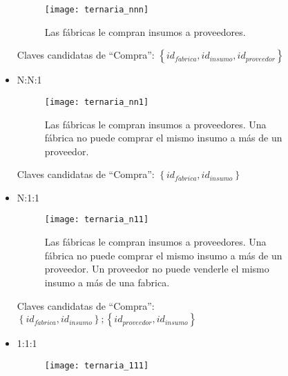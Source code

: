 \documentclass[a4paper, twoside]{article}
\begin{document}
\begin{description}
\begin{itemize}
\begin{figure}[H]
\noindent \begin{centering}
\texttt{[image: ternaria\_nnn]}
\par\end{centering}

\protect\caption{Las fábricas le compran insumos a proveedores.}


\end{figure}



Claves candidatas de ``Compra'': $\left\{ id_{f\acute{a}brica},id_{insumo},id_{proveedor}\right\} $

\item N:N:1


\begin{figure}[H]
\noindent \begin{centering}
\texttt{[image: ternaria\_nn1]}
\par\end{centering}

\protect\caption{Las fábricas le compran insumos a proveedores. Una fábrica no puede
comprar el mismo insumo a más de un proveedor.}
\end{figure}



Claves candidatas de ``Compra'': $\left\{ id_{f\acute{a}brica},id_{insumo}\right\} $

\item N:1:1


\begin{figure}[H]
\noindent \begin{centering}
\texttt{[image: ternaria\_n11]}
\par\end{centering}

\protect\caption{Las fábricas le compran insumos a proveedores. Una fábrica no puede
comprar el mismo insumo a más de un proveedor. Un proveedor no puede
venderle el mismo insumo a más de una fabrica.}
\end{figure}



Claves candidatas de ``Compra'': $\left\{ id_{f\acute{a}brica},id_{insumo}\right\} ;\left\{ id_{proveedor},id_{insumo}\right\} $

\item 1:1:1


\begin{figure}[H]
\noindent \begin{centering}
\texttt{[image: ternaria\_111]}
\par\end{centering}


\end{figure}
\end{itemize}
\end{description}
\end{document}
